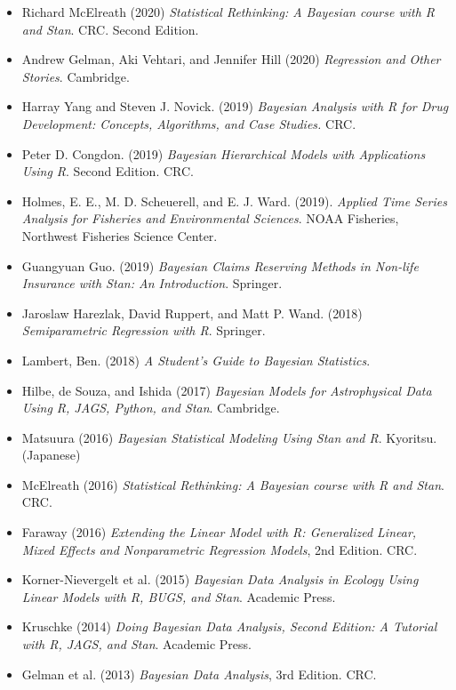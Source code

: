 \documentclass[10pt]{report}
\begin{document}
{\begin{itemize}
\item Richard McElreath (2020) {\slshape Statistical Rethinking: A Bayesian course 
    with R and Stan}. CRC. Second Edition.  
\item Andrew Gelman, Aki Vehtari, and Jennifer Hill (2020) {\slshape Regression and Other Stories}. Cambridge.
  \item Harray Yang and Steven J. Novick. (2019) {\slshape Bayesian Analysis with R for Drug Development: Concepts, Algorithms, and Case Studies.} CRC.
\item Peter D. Congdon. (2019) {\slshape Bayesian Hierarchical Models with Applications Using R}. Second Edition. CRC.
\item Holmes, E. E., M. D. Scheuerell, and E. J. Ward. (2019). {\slshape 
    Applied Time Series Analysis for Fisheries and Environmental Sciences}. NOAA Fisheries, Northwest Fisheries Science Center.
\item Guangyuan Guo. (2019) {\slshape Bayesian Claims Reserving Methods in Non-life Insurance with Stan: An Introduction}. Springer.
\item Jaroslaw Harezlak,
David Ruppert, and Matt P. Wand. (2018) {\slshape Semiparametric Regression with R}. Springer.
\item Lambert, Ben.  (2018) {\slshape A Student's Guide to Bayesian 
    Statistics}. 
\item Hilbe, de Souza, and Ishida (2017) {\slshape Bayesian Models for Astrophysical Data Using R, JAGS, Python, and Stan}. Cambridge. 
\item Matsuura (2016) {\slshape Bayesian Statistical Modeling Using Stan and R}. Kyoritsu. (Japanese) 
\item McElreath (2016) {\slshape Statistical Rethinking: A Bayesian course 
    with R and Stan}. CRC. 
\item Faraway (2016) {\slshape Extending the Linear Model with R: Generalized Linear, Mixed Effects and Nonparametric Regression Models}, 2nd Edition. CRC.
\item Korner-Nievergelt et al. (2015) {\slshape Bayesian Data Analysis in
    Ecology Using Linear Models with R, BUGS, and Stan}. Academic Press.
\item Kruschke (2014) {\slshape Doing Bayesian Data Analysis, Second
    Edition: A Tutorial with R, JAGS, and Stan}. Academic Press.
\item Gelman et al. (2013) {\slshape Bayesian Data Analysis}, 3rd Edition. CRC.
\end{itemize}
}
\end{document}
